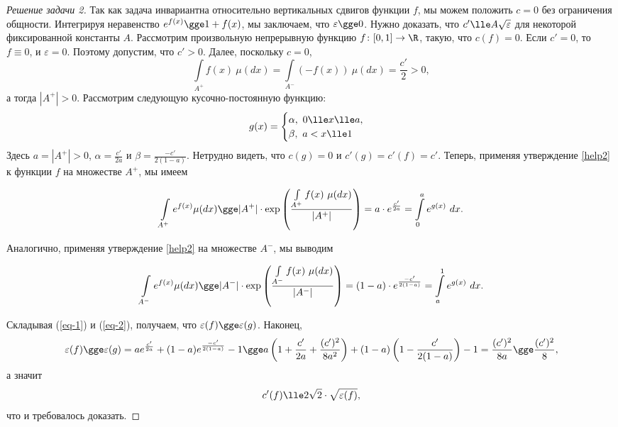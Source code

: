 \documentclass[a4paper, 12pt]{article}
\begin{document}
\begin{proof}[Решение задачи 2]
    Так как задача инвариантна относительно вертикальных сдвигов функции \(f\), мы можем положить \(c = 0\) без ограничения общности. Интегрируя неравенство \(e^{f(x)} \gge 1 + f(x)\), мы заключаем, что \(\varepsilon \gge 0\). Нужно доказать, что \(c' \lle A \sqrt{\varepsilon}\) для некоторой фиксированной константы \(A\). Рассмотрим произвольную непрерывную функцию \(f \colon [0,1] \to \R\), такую, что \(c(f) = 0\). Если \(c' = 0\), то \(f \equiv 0\), и \(\varepsilon = 0\). Поэтому допустим, что \(c' > 0\). Далее, поскольку \(c = 0\), \[\int\limits_{A^+} f(x) \ \mu(dx) = \int\limits_{A^-} (-f(x)) \ \mu(dx) = \frac{c'}{2} > 0,\] а тогда \(|A^+| > 0\). Рассмотрим следующую кусочно-постоянную функцию: \[g(x) = \begin{cases}
        \alpha, \ 0 \lle x \lle a,\\
        \beta, \ a < x \lle 1
    \end{cases}\] Здесь \(a = |A^+| > 0\), \(\alpha = \frac{c'}{2a}\) и \(\beta = \frac{-c'}{2(1-a)}\). Нетрудно видеть, что \(c(g) = 0\) и \(c'(g) = c'(f) = c'\). Теперь, применяя утверждение \ref{help2} к функции \(f\) на множестве \(A^+\), мы имеем

    \begin{equation}\label{eq-1}
        \int\limits_{A^+} e^{f(x)} \mu(dx) \gge |A^+| \cdot \exp\left(\frac{\int\limits_{A^+} f(x) \ \mu(dx)}{|A^+|}\right) = a \cdot e^\frac{c'}{2a} = \int\limits_0^a e^{g(x)}\ dx.
    \end{equation}
    
    Аналогично, применяя утверждение \ref{help2} на множестве \(A^-\), мы выводим

    \begin{equation}\label{eq-2}
        \int\limits_{A^-} e^{f(x)} \mu(dx) \gge |A^-| \cdot \exp\left(\frac{\int\limits_{A^-} f(x) \ \mu(dx)}{|A^-|}\right) = (1-a) \cdot e^\frac{-c'}{2(1-a)} = \int\limits_a^1 e^{g(x)}\ dx.
    \end{equation}
    
    Складывая (\ref{eq-1}) и (\ref{eq-2}), получаем, что \(\varepsilon(f) \gge \varepsilon(g)\). Наконец, \[\varepsilon(f) \gge \varepsilon(g) = a e^{\frac{c'}{2a}} + (1-a) e^\frac{-c'}{2(1-a)} - 1 \gge a\left(1 + \frac{c'}{2a} + \frac{(c')^2}{8a^2}\right) + (1-a)\left(1 - \frac{c'}{2(1-a)}\right) - 1 = \frac{(c')^2}{8a} \gge \frac{(c')^2}{8},\] а значит \[c'(f) \lle 2\sqrt{2} \cdot \sqrt{\varepsilon(f)},\] что и требовалось доказать.
\end{proof}
\end{document}
